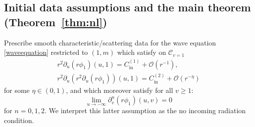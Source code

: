\documentclass[11pt,english]{article}
\numberwithin{equation}{section}
\theoremstyle{remark}
\theoremstyle{plain}
\theoremstyle{remark}
\newcommand{\pu}{\partial_u}
\newcommand{\pv}{\partial_v}
\renewcommand{\(}{\left(}
\renewcommand{\)}{\right)}
\newcommand{\ccc}{C_{\mathrm{in}}^{(2)}}
\newcommand{\pho}{(r\phi_1)}
\begin{document}
\subsection{Initial data assumptions and the main theorem (Theorem~\ref{thm:nl})}
Prescribe smooth characteristic/scattering data for the wave equation \eqref{waveequation} restricted to $(1,m)$  which satisfy on $\mathcal C_{v=1}$
\begin{align}\label{eq:nl:ass1}
	r^2\pu\pho(u,1)=C_{\mathrm{in}}^{(1)}+\mathcal{O}(r^{-1}),\\
	r^2\pu(r^2\pu\pho)(u,1)=\ccc+\mathcal{O}(r^{-\eta})\label{eq:nl:ass2}
\end{align}
for some $\eta\in(0,1)$, and which moreover satisfy for all $v\geq 1$:
\begin{equation}\label{eq:nl:assNoIncoming}
\lim_{u\to-\infty}\pv^n(r\phi_1)(u,v)=0
\end{equation}
for $n=0,1,2$. We interpret this latter assumption as the no incoming radiation condition.
\end{document}
